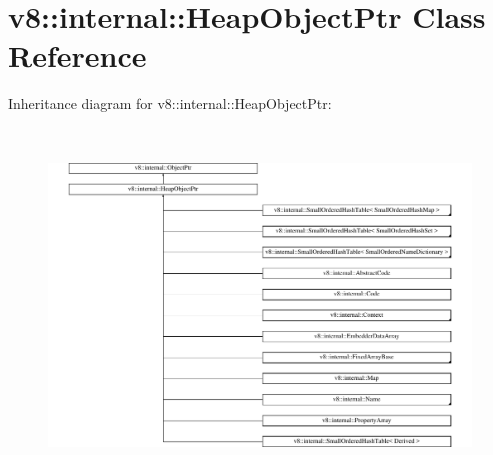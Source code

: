 \hypertarget{classv8_1_1internal_1_1HeapObjectPtr}{}\section{v8\+:\+:internal\+:\+:Heap\+Object\+Ptr Class Reference}
\label{classv8_1_1internal_1_1HeapObjectPtr}
Inheritance diagram for v8\+:\+:internal\+:\+:Heap\+Object\+Ptr\+:\begin{figure}[H]
\begin{center}
\leavevmode
\includegraphics[height=9.377991cm]{classv8_1_1internal_1_1HeapObjectPtr}
\end{center}
\end{figure}
